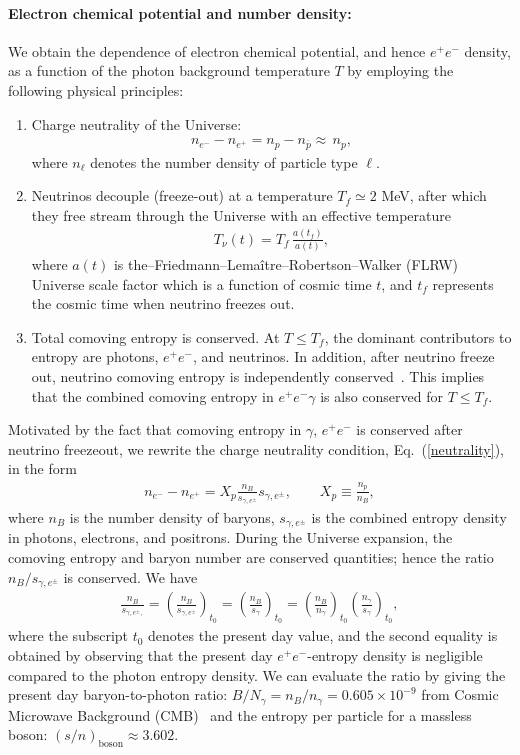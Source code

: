 \paragraph{Electron chemical potential and number density:}
We obtain the dependence of electron chemical potential, and hence $e^+e^-$ density, as a function of the photon background temperature $T$ by employing the following physical principles:
\begin{enumerate}
\item Charge neutrality of the Universe:
\begin{align}\label{neutrality}
n_{e^-}-n_{{e^+}}=n_p-n_{\overline{p}}\approx\,n_p,
\end{align}
where $n_\ell$ denotes the number density of particle type $\ell$.
\item Neutrinos decouple (freeze-out) at a temperature $T_f\simeq 2$ MeV, after which they free stream through the Universe with an effective temperature~\cite{Birrell:2012gg}
\begin{align}
 T_\nu(t)=T_f\,\frac{a(t_f)}{a(t)},
\end{align}
where $a(t)$ is the--Friedmann--Lema\^{i}tre--Robertson--Walker (FLRW) Universe scale factor which is a function of cosmic time $t$, and $t_f$ represents the cosmic time when neutrino freezes out.
\item Total comoving entropy is conserved. At $T\leq T_f$, the dominant contributors to entropy are photons, $e^+e^-$, and neutrinos. In addition, after neutrino freeze out, neutrino comoving entropy is independently conserved~\cite{Birrell:2012gg}. This implies that the combined comoving entropy in $e^+e^-\gamma$ is also conserved for $T\leq T_f$.
\end{enumerate} 
Motivated by the fact that comoving entropy in $\gamma$, $e^+e^-$ is conserved after neutrino freezeout, we rewrite the charge neutrality condition, Eq.~(\ref{neutrality}), in the form
\begin{align}\label{charge_neutral_cond2}
n_{e^-}-n_{{e^+}}=X_p\frac{n_B}{s_{\gamma,e^\pm}} s_{\gamma,e^\pm},\qquad X_p\equiv\frac{n_p}{n_B},
\end{align}
where $n_B$ is the number density of baryons, $s_{\gamma,e^\pm}$ is the combined entropy density in photons, electrons, and positrons. During the Universe expansion, the comoving entropy and baryon number are conserved quantities; hence the ratio $n_B/s_{\gamma,e^\pm}$ is conserved. We have
\begin{align}
\frac{n_B}{s_{\gamma,e^\pm,}}=\left(\frac{n_B}{s_{\gamma,e^\pm}}\right)_{t_0}\!\!\!\!=\left(\frac{n_B}{s_{\gamma}}\right)_{t_0}\!\!\!\!=\left(\frac{n_B}{n_\gamma}\right)_{t_0}\left(\frac{n_\gamma}{s_{\gamma}}\right)_{t_0},
\end{align}
where the subscript $t_0$ denotes the present day value, and the second equality is obtained by observing that the present day $e^+e^-$-entropy density is negligible compared to the photon entropy density. We can evaluate the ratio by giving the present day baryon-to-photon ratio: $B/N_\gamma =n_B/n_\gamma= 0.605\times10^{-9}$ from Cosmic Microwave Background (CMB)~\cite{ParticleDataGroup:2022pth} and the entropy per particle for a massless boson: $(s/n)_{\mathrm{boson}}\approx 3.602$.

